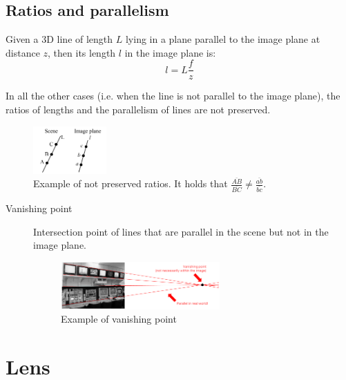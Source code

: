 \subsection{Ratios and parallelism}

Given a 3D line of length $L$ lying in a plane parallel to the image plane at distance $z$,
then its length $l$ in the image plane is:
\[ l = L\frac{f}{z} \]

In all the other cases (i.e. when the line is not parallel to the image plane), 
the ratios of lengths and the parallelism of lines are not preserved.

\begin{figure}[H]
    \centering
    \includegraphics[width=0.25\textwidth]{./img/_perspective_projection_ratio.pdf}
    \caption{Example of not preserved ratios. It holds that $\frac{\overline{AB}}{\overline{BC}} \neq \frac{\overline{ab}}{\overline{bc}}$.}
\end{figure}

\begin{description}
    \item[Vanishing point] 
        Intersection point of lines that are parallel in the scene but not in the image plane.

        \begin{figure}[H]
            \centering
            \includegraphics[width=0.6\textwidth]{./img/_vanishing_point.pdf}
            \caption{Example of vanishing point}
        \end{figure}
\end{description}



\section{Lens}

